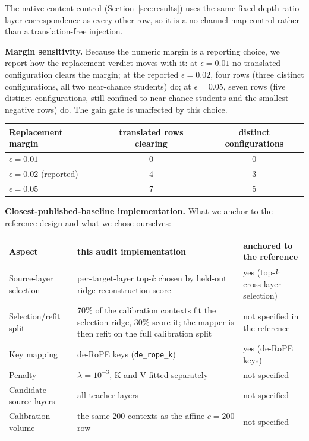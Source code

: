 \documentclass[10pt]{article}
\begin{document}
The native-content control (Section~\ref{sec:results}) uses the same fixed
depth-ratio layer correspondence as every other row, so it is a
no-channel-map control rather than a translation-free injection.

\textbf{Margin sensitivity.} Because the numeric margin is a reporting choice, we report how the
replacement verdict moves with it: at $\epsilon{=}0.01$ no translated configuration clears the margin; at
the reported $\epsilon{=}0.02$, four rows (three distinct configurations, all two near-chance students) do;
at $\epsilon{=}0.05$, seven rows (five distinct configurations, still confined to near-chance students and the
smallest negative rows) do. The gain gate is unaffected by this choice.

\begin{center}\scriptsize
\begin{tabular}{lcc}
\toprule
Replacement margin & translated rows clearing & distinct configurations \\
\midrule
$\epsilon=0.01$ & 0 & 0 \\
$\epsilon=0.02$ (reported) & 4 & 3 \\
$\epsilon=0.05$ & 7 & 5 \\
\bottomrule
\end{tabular}\end{center}

\textbf{Closest-published-baseline implementation.} What we anchor to the reference design and what we chose
ourselves:

\begin{center}\footnotesize
\begin{tabular}{p{3.0cm}p{5.5cm}p{3.6cm}}
\toprule
Aspect & this audit implementation & anchored to the reference \\
\midrule
Source-layer selection & per-target-layer top-$k$ chosen by held-out ridge reconstruction score
 & yes (top-$k$ cross-layer selection) \\
Selection/refit split & 70\% of the calibration contexts fit the selection ridge, 30\% score it; the mapper is
then refit on the full calibration split & not specified in the reference \\
Key mapping & de-RoPE keys (\texttt{de\_rope\_k}) & yes (de-RoPE keys) \\
Penalty & $\lambda=10^{-3}$, K and V fitted separately & not specified \\
Candidate source layers & all teacher layers & not specified \\
Calibration volume & the same 200 contexts as the affine $c{=}200$ row & not specified \\
\bottomrule
\end{tabular}\end{center}
\end{document}
